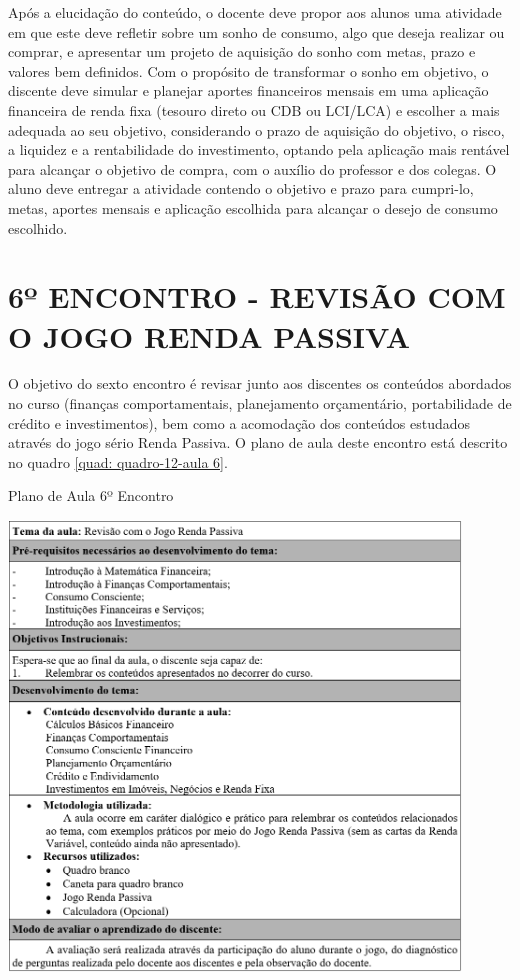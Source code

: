 Após a elucidação do conteúdo, o docente deve propor aos alunos uma atividade em que este deve refletir sobre um sonho de consumo, algo que deseja realizar ou comprar, e apresentar um projeto de aquisição do sonho com metas, prazo e valores bem definidos. Com o propósito de transformar o sonho em objetivo, o discente deve simular e planejar aportes financeiros mensais em uma aplicação financeira de renda fixa (tesouro direto ou CDB ou LCI/LCA) e escolher a mais adequada ao seu objetivo, considerando o prazo de aquisição do objetivo, o risco, a liquidez e a rentabilidade do investimento, optando pela aplicação mais rentável para alcançar o objetivo de compra, com o auxílio do professor e dos colegas. O aluno deve entregar a atividade contendo o objetivo e prazo para cumpri-lo, metas, aportes mensais e aplicação escolhida para alcançar o desejo de consumo escolhido.

\section{6º ENCONTRO - REVISÃO COM O JOGO RENDA PASSIVA}
O objetivo do sexto encontro é revisar junto aos discentes os conteúdos abordados no curso (finanças comportamentais, planejamento orçamentário, portabilidade de crédito e investimentos), bem como a acomodação dos conteúdos estudados através do jogo sério Renda Passiva. O plano de aula deste encontro está descrito no quadro \ref{quad: quadro-12-aula 6}.

\graphicspath{{quadros/}} 
\begin{quadro}[!ht]
\centering
\begin{minipage}{0.8\textwidth}
\caption{Plano de Aula 6º Encontro}
\centering
\includegraphics[width=0.9\textwidth]{quadro-12-aula 6}
\label{quad: quadro-12-aula 6}
\end{minipage}
\end{quadro}

